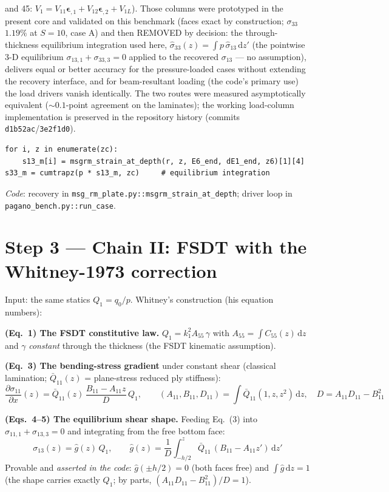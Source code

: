 \documentclass[11pt]{article}
\newcommand{\code}[1]{\texttt{#1}}
\begin{document}
and 45: $V_1 = V_{11}\bm\epsilon_{,1} + V_{12}\bm\epsilon_{,2} + V_{1L}$).  Those
columns were prototyped in the present core and validated on this benchmark (faces
exact by construction; $\sigma_{33}$ $1.19\%$ at $S{=}10$, case A) and then REMOVED by
decision: the through-thickness equilibrium integration used here,
$\hat\sigma_{33}(z) = \int p\,\hat\sigma_{13}\,\mathrm dz'$ (the pointwise 3-D
equilibrium $\sigma_{13,1}+\sigma_{33,3}=0$ applied to the recovered $\sigma_{13}$ ---
no assumption), delivers equal or better accuracy for the pressure-loaded cases
without extending the recovery interface, and for beam-resultant loading (the code's
primary use) the load drivers vanish identically.  The two routes were measured
asymptotically equivalent ($\sim0.1$-point agreement on the laminates); the working
load-column implementation is preserved in the repository history (commits
\code{d1b52ac}/\code{3e2f1d0}).
\begin{verbatim}
for i, z in enumerate(zc):
    s13_m[i] = msgrm_strain_at_depth(r, z, E6_end, dE1_end, z6)[1][4]
s33_m = cumtrapz(p * s13_m, zc)     # equilibrium integration
\end{verbatim}
\emph{Code}: recovery in \code{msg\_rm\_plate.py::msgrm\_strain\_at\_depth};
driver loop in \code{pagano\_bench.py::run\_case}.

\section{Step 3 --- Chain II: FSDT with the Whitney-1973 correction}

Input: the same statics $Q_1 = q_0/p$.  Whitney's construction (his equation numbers):

\textbf{(Eq.~1) The FSDT constitutive law.}
$Q_1 = k_1^2 A_{55}\,\gamma$ with $A_{55} = \int C_{55}(z)\,\mathrm dz$ and $\gamma$
\emph{constant} through the thickness (the FSDT kinematic assumption).

\textbf{(Eq.~3) The bending-stress gradient} under constant shear (classical lamination;
$\bar Q_{11}(z)$ = plane-stress reduced ply stiffness):
\begin{equation}
\frac{\partial\sigma_{11}}{\partial x}(z) = \bar Q_{11}(z)\,\frac{B_{11}-A_{11}z}{D}\,Q_1,
\qquad (A_{11},B_{11},D_{11}) = \!\int\! \bar Q_{11}(1,z,z^2)\,\mathrm dz,\quad
D = A_{11}D_{11}-B_{11}^2
\end{equation}

\textbf{(Eqs.~4--5) The equilibrium shear shape.}  Feeding Eq.~(3) into
$\sigma_{11,1}+\sigma_{13,3}=0$ and integrating from the free bottom face:
\begin{equation}
\sigma_{13}(z) = \hat g(z)\,Q_1,\qquad
\hat g(z) = \frac1D\int_{-h/2}^{z}\bar Q_{11}\,(B_{11}-A_{11}z')\,\mathrm dz'
\end{equation}
Provable and \emph{asserted in the code}: $\hat g(\pm h/2) = 0$ (both faces free) and
$\int\hat g\,\mathrm dz = 1$ (the shape carries exactly $Q_1$; by parts,
$(A_{11}D_{11}-B_{11}^2)/D = 1$).
\end{document}
